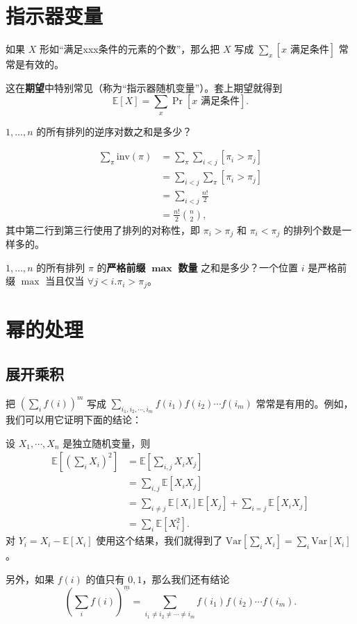 \section{指示器变量}
    如果 $X$ 形如“满足xxx条件的元素的个数”，那么把 $X$ 写成 $\sum_x [x\text{ 满足条件}]$ 常常是有效的。
    \begin{remark}
    这在\textbf{期望}中特别常见（称为“指示器随机变量”）。套上期望就得到 
    $$
    \mathbb{E}[X]=\sum_x \Pr[x\text{ 满足条件}].
    $$
    \end{remark}
    \begin{example}
        $1,\ldots,n$ 的所有排列的逆序对数之和是多少？
    \end{example}
    \begin{solution}
        $$
        \begin{aligned}
        \sum_{\pi}\mathrm{inv}(\pi)&=\sum_{\pi}\sum_{i<j}[\pi_i>\pi_j]\\
        &=\sum_{i<j}\sum_{\pi}[\pi_i>\pi_j]\\
        &=\sum_{i<j}\frac{n!}{2}\\
        &=\frac{n!}{2}\binom{n}{2},
        \end{aligned}
        $$
        其中第二行到第三行使用了排列的对称性，即 $\pi_i>\pi_j$ 和 $\pi_i<\pi_j$ 的排列个数是一样多的。
    \end{solution}
    \begin{exercise}
    $1,\ldots,n$ 的所有排列 $\pi$ 的\textbf{严格前缀} $\mathbf{\max}$ \textbf{数量} 之和是多少？一个位置 $i$ 是严格前缀 $\max$ 当且仅当 $\forall j<i.\pi_i>\pi_j$。
    \end{exercise}
\section{幂的处理}
\subsection{展开乘积}
    把 $\left(\sum_i f(i)\right)^m$ 写成 $\sum_{i_1,i_2,\cdots,i_m}f(i_1)f(i_2)\cdots f(i_m)$ 常常是有用的。例如，我们可以用它证明下面的结论：
    \begin{example}
        设 $X_1,\cdots,X_n$ 是独立随机变量，则
        $$
        \begin{aligned}
        \mathbb E\left[\left(\sum_i X_i\right)^2\right]&=\mathbb E\left[\sum_{i,j}X_iX_j\right]\\
        &=\sum_{i,j}\mathbb E[X_iX_j]\\
        &=\sum_{i\ne j}\mathbb E[X_i]\mathbb E[X_j]+\sum_{i=j} \mathbb E[X_iX_j]\\
        &=\sum_i \mathbb E[X_i^2].
        \end{aligned}
        $$
        对 $Y_i=X_i-\mathbb E[X_i]$ 使用这个结果，我们就得到了 $\mathrm{Var}[\sum_i X_i]=\sum_i \mathrm{Var}[X_i]$。
    \end{example}
    另外，如果 $f(i)$ 的值只有 $0,1$，那么我们还有结论
    $$
    \left(\sum_i f(i)\right)^{\underline{m}}=\sum_{i_1\ne i_2\ne \cdots\ne i_m}f(i_1)f(i_2)\cdots f(i_m).
    $$
